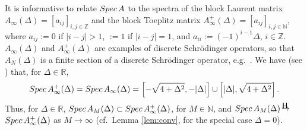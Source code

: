 \documentclass[preprint,1p,11pt]{elsarticle}
\newcommand\N{{\mathbb N}}
\newcommand\R{{\mathbb R}}
\newcommand\Z{{\mathbb Z}}
\newcommand\Spec{{\rm Spec}\,}  %
\newcommand\Hto{
   \unitlength0.1ex
   \begin{picture}(30,15)
   \put(13,16){\makebox(0,0)[]{\tiny\rm H}}
   \put(15,5){\makebox(0,0)[]{$\to$}}
   \end{picture}
}
\numberwithin{equation}{section}   %
\numberwithin{figure}{section}  %
\begin{document}
It is informative to relate $\Spec A$ to the spectra of the block Laurent matrix $A_\infty(\Delta)=[a_{ij}]_{i,j\in \Z}$ and the block Toeplitz matrix $A^+_\infty(\Delta)=[a_{ij}]_{i,j\in \N}$, where $a_{ij}:=0$ if $|i-j|>1$, $:=1$ if $|i-j|=1$, and $a_{ii} := (-1)^{i-1}\Delta$, $i\in \Z$.  $A_\infty(\Delta)$ and $A^+_\infty(\Delta)$ are examples of discrete Schr\"odinger operators, so that $A_N(\Delta)$ is a finite section of a discrete Schr\"odinger operator, e.g.~\cite{Gabeletal23}. We have (see \cite[Examples 3.5(c), 3.10(a)]{Gabeletal23}) that, for $\Delta\in \R$,
\begin{equation} \label{eq:SpAinf}
\Spec A^+_\infty(\Delta)=\Spec A_\infty(\Delta) = \left[-\sqrt{4+\Delta^2},-|\Delta|\right]\cup\left[|\Delta|,\sqrt{4+\Delta^2}\right].
\end{equation}
Thus, for $\Delta\in \R$,  $\Spec A_M(\Delta) \subset \Spec A^+_\infty(\Delta)$, for $M\in \N$, and $\Spec A_M(\Delta)\Hto$ $\Spec A^+_\infty(\Delta)$ as $M\to\infty$ (cf.~Lemma \ref{lem:conv}, for the special case $\Delta=0$). 
\end{document}
